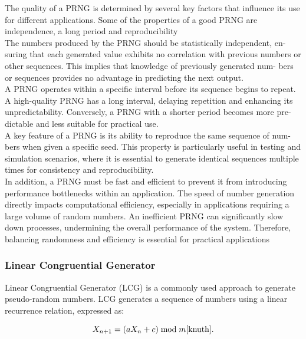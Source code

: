 The quality of a PRNG is determined by several key factors that influence its
use for different applications. Some of the properties of a good PRNG are independence, a long period and reproducibility
\newline \\
The numbers produced by the PRNG should be statistically independent, en-
suring that each generated value exhibits no correlation with previous numbers
or other sequences. This implies that knowledge of previously generated num-
bers or sequences provides no advantage in predicting the next output.
\newline \\
A PRNG operates within a specific interval before its sequence begins to repeat.
A high-quality PRNG has a long interval, delaying repetition and enhancing its
unpredictability. Conversely, a PRNG with a shorter period becomes more pre-
dictable and less suitable for practical use.
\newline \\
A key feature of a PRNG is its ability to reproduce the same sequence of num-
bers when given a specific seed. This property is particularly useful in testing
and simulation scenarios, where it is essential to generate identical sequences
multiple times for consistency and reproducibility.
\newline \\
In addition, a PRNG must be fast and efficient to prevent it from introducing
performance bottlenecks within an application. The speed of number generation
directly impacts computational efficiency, especially in applications requiring a
large volume of random numbers. An inefficient PRNG can significantly slow
down processes, undermining the overall performance of the system. Therefore,
balancing randomness and efficiency is essential for practical applications

\subsubsection{Linear Congruential Generator}

Linear Congruential Generator (LCG) is a commonly used approach to generate
pseudo-random numbers. LCG generates a sequence of numbers using a linear
recurrence relation, expressed as:

\begin{equation}
X_{n+1} = (aX_n + c) \bmod m \cite{knuth}.
\end{equation}

